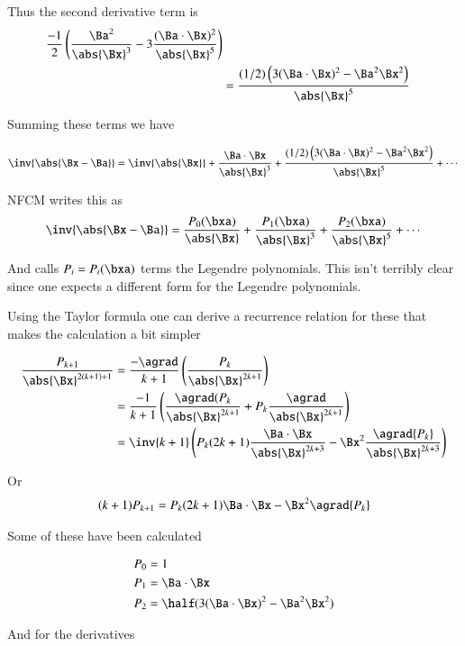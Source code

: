 Thus the second derivative term is 
\begin{align*}
\frac{-1}{2}
\left( 
\frac{\Ba^2}{{\abs{\Bx}}^3} -3 \frac{(\Ba \cdot \Bx)^2} {{\abs{\Bx}}^5} \right) \\
&=
\frac{ (1/2)\left( 3 (\Ba \cdot \Bx)^2 - \Ba^2 \Bx^2 \right) }
{ {{\abs{\Bx}}^5} } 
\\
\end{align*}

Summing these terms we have

\[
\inv{\abs{\Bx -\Ba}} =
\inv{\abs{\Bx}} +
\frac{ \Ba \cdot \Bx } { {\abs{\Bx}}^3 } +
\frac{ (1/2)\left( 3 (\Ba \cdot \Bx)^2 - \Ba^2 \Bx^2 \right) } { {{\abs{\Bx}}^5} } + \cdots
\]

NFCM writes this as
\[
\inv{\abs{\Bx -\Ba}} =
\frac{ P_0(\bxa) } {  \abs{\Bx}} +
\frac{ P_1(\bxa) } { {\abs{\Bx}}^3 } +
\frac{ P_2(\bxa) } { {\abs{\Bx}}^5 } + \cdots
\]

And calls $P_i = P_i(\bxa)$ terms the Legendre polynomials.  This isn't terribly clear since one expects a different form for the Legendre polynomials.

Using the Taylor formula one can derive a recurrence relation for these that makes the calculation a bit
simpler

\begin{align*}
\frac{P_{k+1}}{\abs{\Bx}^{2(k+1)+1}}
&= \frac{-\agrad}{k+1}\left(\frac{P_k}{\abs{\Bx}^{2k+1}}\right) \\
&= 
\frac{-1}{k+1}
\left(
\frac{\agrad({P_k}}
{\abs{\Bx}^{2k+1}}
+
{P_k}\frac{\agrad}
{\abs{\Bx}^{2k+1}}
\right) \\
&= 
\inv{k+1}
\left(
{P_k}(2k+1) \frac{\Ba \cdot \Bx}
{\abs{\Bx}^{2k+3}}
-\Bx^2 \frac{\agrad{P_k}}
{\abs{\Bx}^{2k+3}}
\right) \\
\end{align*}

Or
\begin{align*}
(k+1){P_{k+1}}
=
{P_k}(2k+1) {\Ba \cdot \Bx}
-\Bx^2 {\agrad{P_k}}
\end{align*}

Some of these have been calculated

\begin{align*}
P_0 &= 1 \\
P_1 &= \Ba \cdot \Bx \\
P_2 &= \half(3(\Ba \cdot \Bx)^2 -\Ba^2\Bx^2) \\
\end{align*}

And for the derivatives

